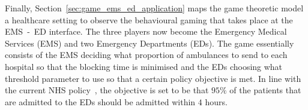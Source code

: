 Finally, Section~\ref{sec:game_ems_ed_application} maps the game theoretic
model a healthcare setting to observe the behavioural gaming that takes place
at the EMS~-~ED interface.
The three players now become the Emergency Medical Services (EMS) and two
Emergency Departments (EDs).
The game essentially consists of the EMS deciding what proportion of
ambulances to send to each hospital so that the blocking time is minimised and
the EDs choosing what threshold parameter to use so that a certain policy
objective is met.
In line with the current NHS policy~\cite{fourhourtarget},
the objective is set to be that \(95\%\) of the patients that are admitted to
the EDs should be admitted within \(4\) hours.
